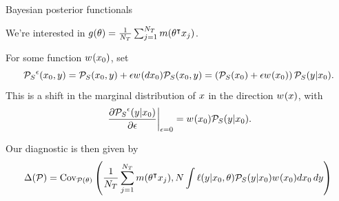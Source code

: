 \begin{frame}[t]{Bayesian posterior functionals}

We're interested in $g(\theta) = \frac{1}{{{N_T}}} \sum_{j=1}^{{N_T}} m(\theta^\intercal x_j)$.

For some function $w^{}(x_{0})$, set
$$
{{\mathcal{P}_{S}}}^\epsilon(x_{0}, y) = 
    {{\mathcal{P}_{S}}}(x_{0}, y) + \epsilon w^{}(d x_{0}) {{\mathcal{P}_{S}}}(x_{0}, y) =
    \left( {{\mathcal{P}_{S}}}(x_{0}) + \epsilon w^{}(x_{0}) \right) {{\mathcal{P}_{S}}}(y \vert x_{0}).
$$
This is a shift in the marginal distribution of $x$ in the direction $w^{}(x)$,
with\\[1em]
$$
\begin{aligned}
    \left. \frac{\partial {{\mathcal{P}_{S}}}^\epsilon(y \vert x_{0})}{\partial \epsilon} \right|_{\epsilon = 0} =
               w^{}(x_{0}) {{\mathcal{P}_{S}}}(y \vert x_{0}).
\end{aligned}
$$

Our diagnostic is then given by
$$
\Delta(\mathcal{P}) =
    \mathrm{Cov}_{\mathcal{P}(\theta)}\left( 
        \frac{1}{{{N_T}}} \sum_{j=1}^{{N_T}} m(\theta^\intercal x_j),
        N \int \ell(y \vert x_{0}, \theta) {{\mathcal{P}_{S}}}(y \vert x_{0}) w^{}(x_{0}) d x_{0} \, d y
        \right)\,
$$
%
\end{frame}





